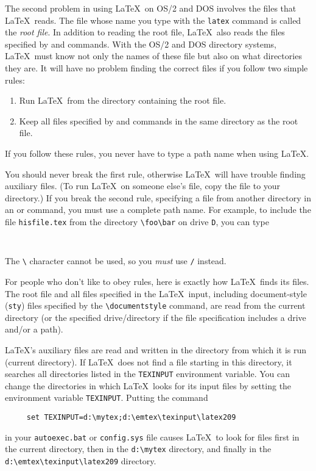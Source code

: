The second problem in using \LaTeX\ on OS/2 and DOS involves the files that
\LaTeX\ reads.  The file whose name you type with the {\tt latex}
command is called the {\em root file}.  In addition to reading the root
file, \LaTeX\ also reads the files specified by \hbox{\verb||}
and \hbox{\verb||} commands.  With the OS/2 and DOS directory systems,
\LaTeX\ must know not only the names of these file but also on what
directories they are.  It will have no problem finding the correct
files if you follow two simple rules:
\begin{enumerate}
 \item Run \LaTeX\ from the directory containing the root file.
 \item Keep all files specified by \hbox{\verb||} and 
      \hbox{\verb||} commands in the same directory as the root
       file.
\end{enumerate}
If you follow these rules, you never have to type a path name
when using \LaTeX.
 
You should never break the first rule, otherwise \LaTeX\ will have
trouble finding auxiliary files.  (To run \LaTeX\ on someone else's
file, copy the file to your directory.) If you break the second
rule, specifying a file from another directory in an
\hbox{\verb||} or \hbox{\verb||} command, you must use a
complete path name.  For example, to include the file \mbox{\tt hisfile.tex} 
from the directory \hbox{\verb|\foo\bar|} on drive \verb|D|, you can type
\begin{verbatim}
     
\end{verbatim}
The \verb|\| character cannot be used, so you {\em must\/}
use \verb|/| instead.
 
For people who don't like to obey rules, 
here is exactly how \LaTeX\ finds its
files.  The root file and all files specified in the \LaTeX\ input,
including document-style ({\tt sty}) files specified by the
\hbox{\verb|\documentstyle|} command,
are read from the current directory (or the specified drive/directory if
the file specification includes a drive and/or a path).

\LaTeX's auxiliary files are read and written in the directory from
which it is run (current directory).
If \LaTeX\ does not find a file starting in this directory,
it searches all directories listed in the \verb|TEXINPUT| environment
variable.
You can change the directories in which \LaTeX\ looks for its input files
by setting the environment variable \verb|TEXINPUT|.
Putting the command
\begin{verbatim}
     set TEXINPUT=d:\mytex;d:\emtex\texinput\latex209
\end{verbatim}
in your \verb|autoexec.bat| or \verb|config.sys| file causes \LaTeX\ to
look for files first in the current directory, then in the \verb|d:\mytex|
directory, and finally in the \verb|d:\emtex\texinput\latex209| directory.
 
